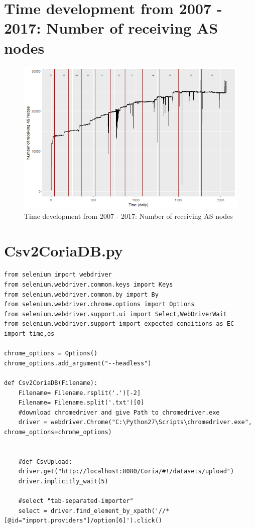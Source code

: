 \documentclass[conference, 11pt]{IEEEtran}
\begin{document}
\begin{appendices}
\section{Time development from 2007 - 2017: Number of receiving AS nodes}

\begin{figure}[htbp]
\centerline{\includegraphics[scale=0.4]{Graphics/ASToAll.png}}
\caption{Time development from 2007 - 2017: Number of receiving AS nodes}
\label{fig}
\end{figure}

\section{Csv2CoriaDB.py}
\begin{lstlisting}[float=*]
from selenium import webdriver
from selenium.webdriver.common.keys import Keys
from selenium.webdriver.common.by import By
from selenium.webdriver.chrome.options import Options
from selenium.webdriver.support.ui import Select,WebDriverWait
from selenium.webdriver.support import expected_conditions as EC
import time,os

chrome_options = Options()  
chrome_options.add_argument("--headless")  

def Csv2CoriaDB(Filename):
	Filename= Filename.rsplit('.')[-2]
	Filename= Filename.split('.txt')[0]
	#download chromedriver and give Path to chromedriver.exe
	driver = webdriver.Chrome("C:\Python27\Scripts\chromedriver.exe", chrome_options=chrome_options)


	#def CsvUpload:
	driver.get("http://localhost:8080/Coria/#!/datasets/upload")
	driver.implicitly_wait(5)

	#select "tab-separated-importer"
	select = driver.find_element_by_xpath('//*[@id="import.providers"]/option[6]').click()


\end{lstlisting}
\end{appendices}
\end{document}
